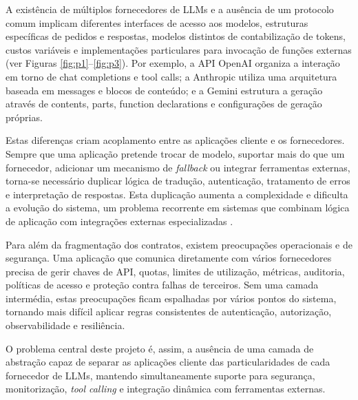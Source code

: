 \documentclass[11pt,a4paper]{report}
\begin{document}
    A existência de múltiplos fornecedores de LLMs e a ausência de um protocolo comum implicam
    diferentes interfaces de acesso aos modelos, estruturas específicas de pedidos e respostas, modelos distintos de contabilização de tokens, custos variáveis e implementações particulares para invocação de funções externas (ver Figuras \ref{fig:p1}--\ref{fig:p3}). Por exemplo, a API OpenAI organiza a interação em torno de chat completions e tool calls; a Anthropic utiliza uma arquitetura baseada em messages e blocos de conteúdo; e a Gemini estrutura a geração através de contents, parts, function declarations e configurações de geração próprias.

    Estas diferenças criam acoplamento entre as aplicações cliente e os fornecedores. Sempre que uma aplicação pretende trocar de modelo, suportar mais do que um fornecedor, adicionar um mecanismo de \textit{fallback} ou integrar ferramentas externas, torna-se necessário duplicar lógica de tradução, autenticação, tratamento de erros e interpretação de respostas. Esta duplicação aumenta a complexidade e dificulta a evolução do sistema, um problema recorrente em sistemas que combinam lógica de aplicação com integrações externas especializadas \cite{ml_code_smells,ml_code_smells1}.

    Para além da fragmentação dos contratos, existem preocupações operacionais e de segurança. Uma aplicação que comunica diretamente com vários fornecedores precisa de gerir chaves de API, quotas, limites de utilização, métricas, auditoria, políticas de acesso e proteção contra falhas de terceiros. Sem uma camada intermédia, estas preocupações ficam espalhadas por vários pontos do sistema, tornando mais difícil aplicar regras consistentes de autenticação, autorização, observabilidade e resiliência.

    O problema central deste projeto é, assim, a ausência de uma camada de abstração capaz de separar as aplicações cliente das particularidades de cada fornecedor de LLMs, mantendo simultaneamente suporte para segurança, monitorização, \textit{tool calling} e integração dinâmica com ferramentas externas.
\end{document}
